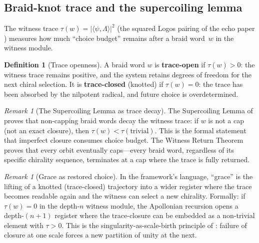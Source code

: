 \documentclass[11pt,a4paper]{article}
\theoremstyle{plain}
\theoremstyle{definition}
\newtheorem{definition}[theorem]{Definition}
\theoremstyle{remark}
\newtheorem{remark}[theorem]{Remark}
\numberwithin{equation}{section}
\begin{document}
\subsection{Braid-knot trace and the supercoiling lemma}
\label{sec:braid-knot}

The witness trace $\tau(w) = |\langle \psi, \Lambda \rangle|^2$
(the squared Logos pairing of the echo paper
\cite{echo-rh}) measures how much ``choice budget'' remains after
a braid word~$w$ in the witness module.

\begin{definition}[Trace openness]
\label{def:trace-openness}
A braid word $w$ is \textbf{trace-open} if $\tau(w) > 0$: the
witness trace remains positive, and the system retains degrees
of freedom for the next chiral selection.  It is
\textbf{trace-closed} (knotted) if $\tau(w) = 0$: the trace has
been absorbed by the nilpotent radical, and future choice is
overdetermined.
\end{definition}

\begin{remark}[The Supercoiling Lemma as trace decay]
\label{rmk:supercoiling}
The Supercoiling Lemma of \cite{echo-rh} proves that non-capping
braid words decay the witness trace: if $w$ is not a cap (not an
exact closure), then $\tau(w) < \tau(\text{trivial})$.
This is the formal statement that imperfect closure consumes
choice budget.  The Witness Return Theorem proves that every
orbit eventually caps---every braid word, regardless of its
specific chirality sequence, terminates at a cap where the
trace is fully returned.
\end{remark}

\begin{remark}[Grace as restored choice]
\label{rmk:grace}
In the framework's language, ``grace'' is the lifting of a
knotted (trace-closed) trajectory into a wider register where the
trace becomes readable again and the witness can select a new
chirality.  Formally: if $\tau(w) = 0$ in the depth-$n$ witness
module, the Apollonian recursion opens a depth-$(n+1)$ register
where the trace-closure can be embedded as a non-trivial
element with $\tau > 0$.  This is the singularity-as-scale-birth
principle of \cite{no-residue-parent}: failure of closure at
one scale forces a new partition of unity at the next.
\end{remark}


\end{document}
